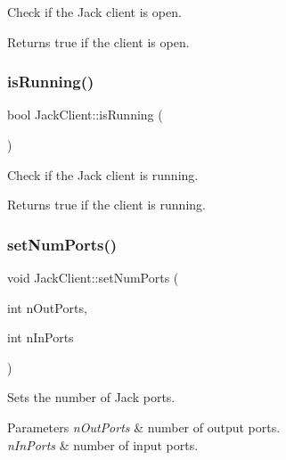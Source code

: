 Check if the Jack client is open. \begin{DoxyReturn}{Returns}
{\ttfamily true} if the client is open. 
\end{DoxyReturn}
\mbox{\label{classdrumpi_1_1audio_1_1JackClient_ab5c76d2572a326d063761b6d8ec4d279}} 
\subsubsection{\texorpdfstring{is\+Running()}{isRunning()}}
{\footnotesize\ttfamily bool Jack\+Client\+::is\+Running (\begin{DoxyParamCaption}{ }\end{DoxyParamCaption})}

Check if the Jack client is running. \begin{DoxyReturn}{Returns}
{\ttfamily true} if the client is running. 
\end{DoxyReturn}
\mbox{\label{classdrumpi_1_1audio_1_1JackClient_abb2363379d125b17299d49def97c289d}} 
\subsubsection{\texorpdfstring{set\+Num\+Ports()}{setNumPorts()}}
{\footnotesize\ttfamily void Jack\+Client\+::set\+Num\+Ports (\begin{DoxyParamCaption}\item[{int}]{n\+Out\+Ports,  }\item[{int}]{n\+In\+Ports }\end{DoxyParamCaption})\hspace{0.3cm}{\ttfamily [private]}}

Sets the number of Jack ports. 
\begin{DoxyParams}{Parameters}
{\em n\+Out\+Ports} & number of output ports. \\
\hline
{\em n\+In\+Ports} & number of input ports. \\
\hline
\end{DoxyParams}
\mbox{\label{classdrumpi_1_1audio_1_1JackClient_ab76c081f0442dbe7ba23ab4715e11256}} 
